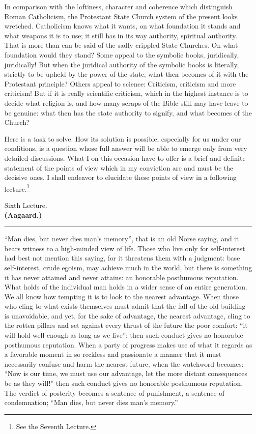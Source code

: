 \documentclass[12pt,a4paper,openany]{book}
\newcommand{\opage}[1]{\marginnote{\footnotesize\textit{[#1]}}}
\newcounter{lect}
\newcommand{\lecture}[2]{\clearpage\stepcounter{lect}\phantomsection\addcontentsline{toc}{chapter}{#1 \csname lecturetitle\arabic{lect}\endcsname}\begin{center}{\large #1}\\[0.4em]{\normalsize\bfseries #2}\\[0.4em]\rule{3em}{0.4pt}\end{center}\medskip\noindent\ignorespaces}
\begin{document}
In comparison with the loftiness, character and
coherence which distinguish Roman Catholicism,
the Protestant State Church system of the present looks
wretched. Catholicism knows what it wants, on
what foundation it stands and what weapons it is to
use; it still has in its way authority, spiritual authority.
That is more than can be said of the
sadly crippled State Churches. On what
foundation would they stand? Some appeal to the
symbolic books, juridically, juridically! But when the juridical
authority of the symbolic books is literally, strictly
to be upheld by the power of the state, what then becomes of it
with the Protestant principle? Others appeal
to science: Criticism, criticism and more criticism!
But if it is really scientific criticism,
which in the highest instance is to decide what religion is,
and how many scraps of the Bible still may
\setcounter{footnote}{0}%
\opage{85}have leave to be genuine: what then has the state authority
to signify, and what becomes of the Church?

Here is a task to solve. How its solution
is possible, especially for us under our conditions, is a
question whose full answer will be able to emerge only from
very detailed discussions. What I on
this occasion have to offer is a brief and definite
statement of the points of view which in my conviction
are and must be the decisive ones. I shall
endeavor to elucidate these points of view in a following
lecture.\footnote{See the Seventh Lecture.}
\setcounter{footnote}{0}%
\lecture{Sixth Lecture.} {(Aagaard.)}
\opage{86}``Man dies, but never dies man's memory'', that is
an old Norse saying, and it bears witness to a high-minded
view of life. Those who live only for self-interest
had best not mention this saying, for it threatens them
with a judgment: base self-interest, crude egoism,
may achieve much in the world, but there is something it
has never attained and never attains: an honorable posthumous reputation.
What holds of the individual man holds
in a wider sense of an entire generation. We all know
how tempting it is to look to the nearest
advantage. When those who cling to what exists themselves
must admit that the fall of the old building is unavoidable,
and yet, for the sake of advantage, the nearest advantage,
cling to the rotten pillars and set against
every thrust of the future the poor comfort: ``it will hold
well enough as long as we live'': then such conduct gives no honorable
posthumous reputation. When a party of progress makes use of what it
regards as a favorable moment in so reckless
and passionate a manner that it must necessarily confuse
and harm the nearest future, when the watchword becomes:
``Now is our time, we must use our advantage, let the
\setcounter{footnote}{0}%
\opage{87}more distant consequences be as they will!'' then such conduct gives no
honorable posthumous reputation. The verdict of posterity becomes a
sentence of punishment, a sentence of condemnation; ``Man dies, but
never dies man's memory.''
\end{document}
